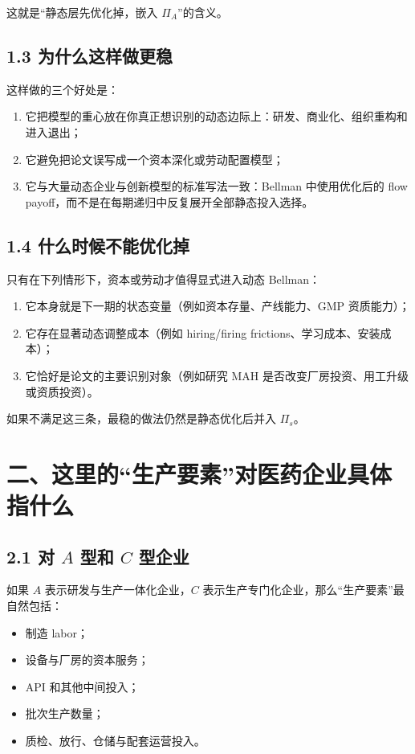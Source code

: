 \documentclass[12pt]{ctexart}
\begin{document}
这就是“静态层先优化掉，嵌入 \(\Pi_A\)”的含义。

\subsection{1.3 为什么这样做更稳}

这样做的三个好处是：

\begin{enumerate}[leftmargin=2em]
    \item 它把模型的重心放在你真正想识别的动态边际上：研发、商业化、组织重构和进入退出；
    \item 它避免把论文误写成一个资本深化或劳动配置模型；
    \item 它与大量动态企业与创新模型的标准写法一致：Bellman 中使用优化后的 flow payoff，而不是在每期递归中反复展开全部静态投入选择。
\end{enumerate}

\subsection{1.4 什么时候不能优化掉}

只有在下列情形下，资本或劳动才值得显式进入动态 Bellman：

\begin{enumerate}[leftmargin=2em]
    \item 它本身就是下一期的状态变量（例如资本存量、产线能力、GMP 资质能力）；
    \item 它存在显著动态调整成本（例如 hiring/firing frictions、学习成本、安装成本）；
    \item 它恰好是论文的主要识别对象（例如研究 MAH 是否改变厂房投资、用工升级或资质投资）。
\end{enumerate}

如果不满足这三条，最稳的做法仍然是静态优化后并入 \(\Pi_s\)。

\section{二、这里的“生产要素”对医药企业具体指什么}

\subsection{2.1 对 \(A\) 型和 \(C\) 型企业}

如果 \(A\) 表示研发与生产一体化企业，\(C\) 表示生产专门化企业，那么“生产要素”最自然包括：

\begin{itemize}[leftmargin=2em]
    \item 制造 labor；
    \item 设备与厂房的资本服务；
    \item API 和其他中间投入；
    \item 批次生产数量；
    \item 质检、放行、仓储与配套运营投入。
\end{itemize}
\end{document}
